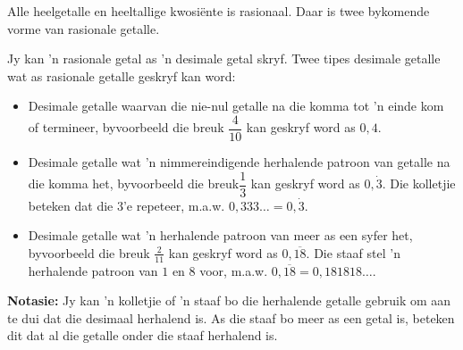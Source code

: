 Alle heelgetalle en heeltallige kwosiënte is rasionaal. Daar is twee bykomende vorme van rasionale getalle.\par 
% 
% 

Jy kan ’n rasionale getal as ’n desimale getal skryf. Twee tipes desimale getalle wat as rasionale getalle geskryf
kan word:\par 
\begin{itemize}
\item Desimale getalle waarvan die nie-nul getalle na die komma tot ’n einde kom of termineer, byvoorbeeld die breuk
 $\dfrac{4}{10}$ kan geskryf word as $0,4$.
\item Desimale getalle wat ’n nimmereindigende herhalende patroon van getalle na die komma het, byvoorbeeld die breuk$\dfrac{1}{3}$ kan geskryf word as
$0,\dot{3}$. 
Die kolletjie beteken dat die $3$’e repeteer, m.a.w. $0,333\ldots=0,\dot{3}$.
\item Desimale getalle wat 'n herhalende patroon van meer as een syfer het, byvoorbeeld die breuk $\frac{2}{11}$ kan geskryf word as 
$0,\overline{18}$. 
Die staaf stel 'n herhalende patroon van $1$ en $8$ voor, m.a.w.
$0,\overline{18} = 0,181818\ldots$.
\end{itemize}

\par
\textbf{Notasie:} Jy kan 'n kolletjie of 'n staaf bo die herhalende getalle gebruik om aan te dui dat die desimaal herhalend is. As die staaf bo meer as een getal is, beteken dit dat al die getalle onder die staaf herhalend is. 

